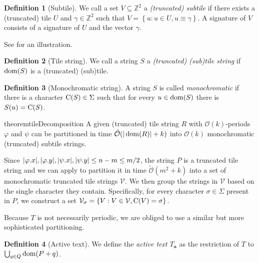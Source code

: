 \documentclass[11pt, letterpaper]{article}
\theoremstyle{plain}
\theoremstyle{definition}
\newtheorem{definition}{Definition}
\theoremstyle{remark}
\newcommand{\Z}{\mathbb{Z}}
\renewcommand{\O}{\mathcal{O}}
\newcommand{\tO}{\tilde{\mathcal{O}}}
\newcommand{\V}{\mathcal{V}}
\renewcommand{\phi}{\varphi}
\newcommand{\set}[1]{\left\lbrace #1 \right\rbrace}
\begin{document}
\begin{definition}[Subtile]\label{subtile_definition}
We call a set $V \subseteq \Z^2$ a \emph{(truncated) subtile} if there exists a (truncated) tile $U$ and $\gamma \in \Z^2$ such that $V = \set{u : u \in U, u \equiv \gamma}$. A signature of $V$ consists of a signature of $U$ and the vector $\gamma$.
\end{definition}

See  for an illustration.

\begin{definition}[Tile string]\label{tile_string_definition}
We call a string $S$ a \emph{(truncated) (sub)tile string} if $\operatorname*{dom}(S)$ is a (truncated) (sub)tile.
\end{definition}

\begin{definition}[Monochromatic string]
A string $S$ is called \emph{monochromatic} if there is a character $\operatorname*{C}(S) \in \Sigma$ such that for every $u \in \operatorname*{dom}(S)$ there is $S(u) = \operatorname*{C}(S)$.  
\end{definition}

\begin{restatable*}{theorem}{tileDecomposition}\label{tile_decomposition}
	A given (truncated) tile string $R$ with $\O(k)$-periods $\phi$ and $\psi$ can be partitioned in time $\tO(|\d{R}| + k)$ into $\O(k)$ monochromatic (truncated) subtile strings.
\end{restatable*}

Since $|\x{\phi}|, |\y{\phi}|, |\x{\psi}|, |\y{\psi}| \le n - m \le m / 2$, the string $P$ is a truncated tile string and we can apply  to partition it in time $\tO(m^2 + k)$ into a set of monochromatic truncated tile strings $\V$. We then group the strings in $\V$ based on the single character they contain. Specifically, for every character $\sigma \in \Sigma$ present in $P$, we construct a set $\V_\sigma = \set{V : V \in \V, \getchar{V} = \sigma}$.



Because $T$ is not necessarily periodic, we are obliged to use a similar but more sophisticated partitioning.

\newcommand{\Ta}{T_\mathbf{a}}
\begin{definition}[Active text]
We define the \emph{active text} $\Ta$ as the restriction of $T$ to $\bigcup_{q \in Q} \operatorname*{dom}(P + q)$. 
\end{definition}
\end{document}
